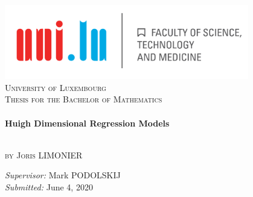 \begin{titlepage}
	\begin{center}
		\includegraphics[width=0.8\textwidth]{images/logo.png}\\[2cm]
		\textsc{\LARGE University of Luxembourg}\\[2cm]
		\textsc{\Large Thesis for the Bachelor of Mathematics}\\[1cm]
		\vspace{1cm}
		\HRule \\[0.7cm]
		
		{ \Huge \bfseries Huigh Dimensional Regression Models}\\[0.4cm]
		
		\HRule \\[1.5cm]
		
		 \vspace{.5cm}
		
		\large
		\textsc{by} \textsc{\Large Joris LIMONIER}\\ %
		
		\vfill
		
		\emph{Supervisor:} Mark PODOLSKIJ\\
		\emph{Submitted:} June 4, 2020
	\end{center}
\end{titlepage}

